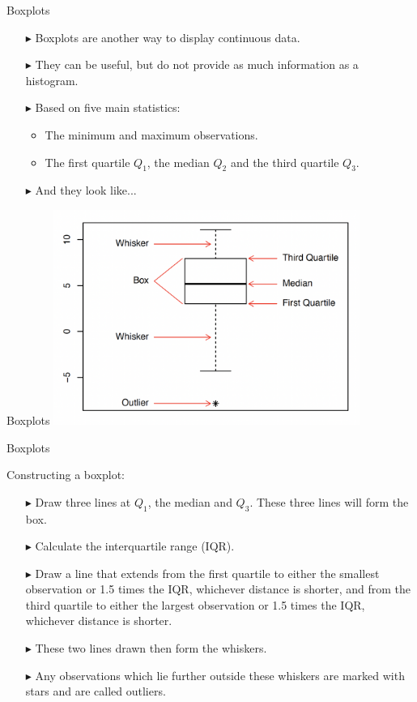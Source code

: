 \documentclass[12pt]{beamer}
\begin{document}
\begin{frame}{Boxplots}
	\begin{itemize}
		\item[$\blacktriangleright$] Boxplots are another way to display continuous data.
		\item[$\blacktriangleright$] They can be useful, but do not provide as much information as a histogram.
		\item[$\blacktriangleright$] Based on five main statistics:
		\begin{itemize}
			\item The minimum and maximum observations.
			\item The first quartile $Q_1$, the median $Q_2$ and the third quartile $Q_3$.
		\end{itemize}
	\item[$\blacktriangleright$] And they look like...
	\end{itemize}
\end{frame}
\begin{frame}{Boxplots}
\centering
\includegraphics[width=10cm]{box.png}
\end{frame}
\begin{frame}{Boxplots}
	
	Constructing a boxplot:
\begin{itemize}
	\item[$\blacktriangleright$] Draw three lines at $Q_1$, the median and $Q_3$. These three lines will form the box.
	\item[$\blacktriangleright$] Calculate the interquartile range (IQR).
	\item[$\blacktriangleright$] Draw a line that extends from the first quartile to either the smallest observation or 1.5 times the IQR, whichever distance is shorter, and from the third quartile to either the largest observation or 1.5 times the IQR, whichever distance is shorter.
	\item[$\blacktriangleright$] These two lines drawn then form the whiskers.
	\item[$\blacktriangleright$] Any observations which lie further outside these whiskers are marked with stars and are called outliers.
\end{itemize}
\end{frame}
\end{document}
